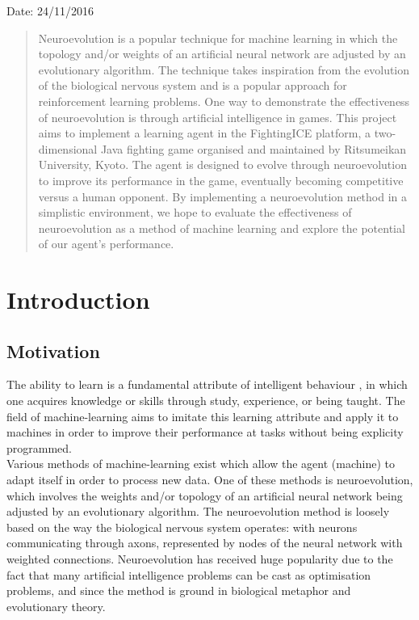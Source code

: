 \documentclass[11pt,a4paper]{article}
\begin{document}
Date: 24/11/2016 
\newpage
\thispagestyle{empty}
\begin{abstract}
Neuroevolution is a popular technique for machine learning in which the topology and/or weights of an artificial neural network are adjusted by an evolutionary algorithm. The technique takes inspiration from the evolution of the biological nervous system and is a popular approach for reinforcement learning problems. One way to demonstrate the effectiveness of neuroevolution is through artificial intelligence in games. This project aims to implement a learning agent in the FightingICE platform, a two-dimensional Java fighting game organised and maintained by Ritsumeikan University, Kyoto. The agent is designed to evolve through neuroevolution to improve its performance in the game, eventually becoming competitive versus a human opponent. By implementing a neuroevolution method in a simplistic environment, we hope to evaluate the effectiveness of neuroevolution as a method of machine learning and explore the potential of our agent's performance.
\end{abstract}
\newpage
\thispagestyle{empty}
\tableofcontents
\newpage
\section{Introduction}
\subsection{Motivation}
The ability to learn is a fundamental attribute of intelligent behaviour \cite{michalski}, in which one acquires knowledge or skills through study, experience, or being taught. The field of machine-learning aims to imitate this learning attribute and apply it to machines in order to improve their performance at tasks without being explicity programmed.\\

Various methods of machine-learning exist which allow the agent (machine) to adapt itself in order to process new data. One of these methods is neuroevolution, which involves the weights and/or topology of an artificial neural network being adjusted by an evolutionary algorithm. The neuroevolution method is loosely based on the way the biological nervous system operates: with neurons communicating through axons, represented by nodes of the neural network with weighted connections. Neuroevolution has received huge popularity due to the fact that many artificial intelligence problems can be cast as optimisation problems, and since the method is ground in biological metaphor and evolutionary theory. \cite{risi}\\
\end{document}
